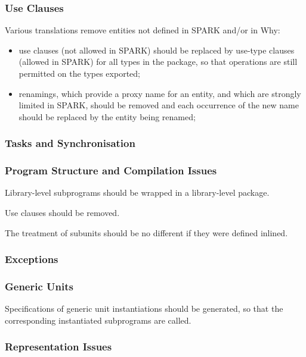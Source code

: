 \documentclass{article}
\begin{document}
\subsubsection{Use Clauses}

Various translations remove entities not defined in SPARK and/or in Why:
\begin{itemize}
\item use clauses (not allowed in SPARK) should be replaced by use-type clauses
  (allowed in SPARK) for all types in the package, so that operations are still
  permitted on the types exported;
\item renamings, which provide a proxy name for an entity, and which are
  strongly limited in SPARK, should be removed and each occurrence of the
  new name should be replaced by the entity being renamed;
\end{itemize}

\subsubsection{Tasks and Synchronisation}

\subsubsection{Program Structure and Compilation Issues}

Library-level subprograms should be wrapped in a library-level package.

Use clauses should be removed.

The treatment of subunits should be no different if they were defined inlined.

\subsubsection{Exceptions}

\subsubsection{Generic Units}

Specifications of generic unit instantiations should be generated, so that the
corresponding instantiated subprograms are called.

\subsubsection{Representation Issues}
\end{document}
